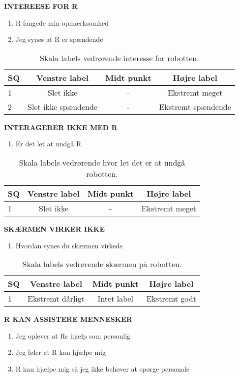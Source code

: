 \noindent
%
\textbf{INTEREESE FOR R}\\
%
\begin{enumerate}
  \item R fangede min opmærksomhed
  \item Jeg synes at R er spændende
\end{enumerate}
%
\begin{table}[H]
	\centering 
	\begin{tabular}{l|c|c|c}
		SQ     & Venstre label & Midt punkt & Højre label \\\hline
		1   & Slet ikke & - & Ekstremt meget          \\\hline
		2   & Slet ikke spændende & - & Ekstremt spændende                 
	\end{tabular}
\caption{Skala labels vedrørende interesse for robotten.}
	\label{tab:InteresseForR}
\end{table}
\noindent
%
\textbf{INTERAGERER IKKE MED R}\\
%
\begin{enumerate}
  \item Er det let at undgå R
\end{enumerate} 
%
\begin{table}[H]
	\centering
	\begin{tabular}{l|c|c|c}
		SQ     & Venstre label & Midt punkt & Højre label \\\hline
		1   & Slet ikke & - & Ekstremt meget                 
	\end{tabular}
\caption{Skala labels vedrørende hvor let det er at undgå robotten.}
	\label{tab:IgnorerR} 
\end{table}
\noindent
%
\textbf{SKÆRMEN VIRKER IKKE}\\
%
\begin{enumerate}
  \item Hvordan synes du skærmen virkede
\end{enumerate}
%
\begin{table}[H]
	\centering 
	\begin{tabular}{l|c|c|c}
		SQ     & Venstre label & Midt punkt & Højre label \\\hline
		1   & Ekstremt dårligt & Intet label & Ekstremt godt                 
	\end{tabular}
\caption{Skala labels vedrørende skærmen på robotten.}
	\label{tab:SkaermenR}
\end{table}
\noindent
%
\textbf{R KAN ASSISTERE MENNESKER}\\
%
\begin{enumerate}
  \item Jeg oplever at Rs hjælp som personlig
  \item Jeg føler at R kan hjælpe mig
  \item R kan hjælpe mig så jeg ikke behøver at spørge personale
\end{enumerate}
